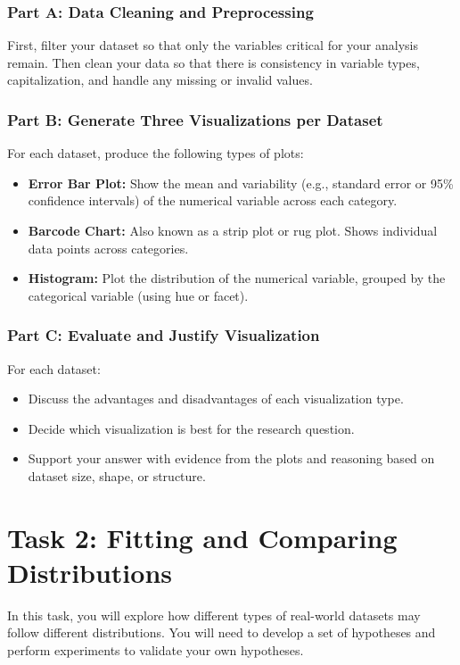 \documentclass[11pt]{article}
\begin{document}
\subsubsection*{Part A: Data Cleaning and Preprocessing}
First, filter your dataset so that only the variables critical for your analysis remain. Then clean your data so that there is consistency in variable types, capitalization, and handle any missing or invalid values.

\subsubsection*{Part B: Generate Three Visualizations per Dataset}
For each dataset, produce the following types of plots:
\begin{itemize}
    \item \textbf{Error Bar Plot:} Show the mean and variability (e.g., standard error or 95\% confidence intervals) of the numerical variable across each category.
    \item \textbf{Barcode Chart:} Also known as a strip plot or rug plot. Shows individual data points across categories.
    \item \textbf{Histogram:} Plot the distribution of the numerical variable, grouped by the categorical variable (using hue or facet).
\end{itemize}

\subsubsection*{Part C: Evaluate and Justify Visualization}
For each dataset:
\begin{itemize}
    \item Discuss the advantages and disadvantages of each visualization type.
    \item Decide which visualization is best for the research question.
    \item Support your answer with evidence from the plots and reasoning based on dataset size, shape, or structure.
\end{itemize}

\newpage
\section*{Task 2: Fitting and Comparing Distributions}

In this task, you will explore how different types of real-world datasets may follow different distributions. You will need to develop a set of hypotheses and perform experiments to validate your own hypotheses. 
\end{document}
